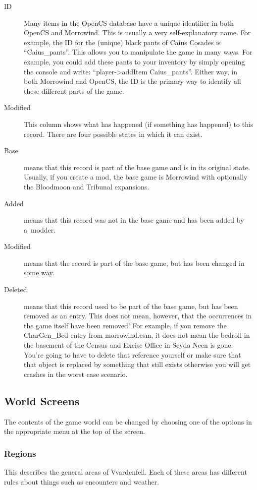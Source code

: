 \begin{description}
\item[ID] Many items in the OpenCS database have a unique identifier in both OpenCS and Morrowind. This is usually a very self-explanatory name. For example, the ID for the (unique) black pants of Caius Cosades is ``Caius\_pants''. This allows you to manipulate the game in many ways. For example, you could add these pants to your inventory by simply opening the console and write: ``player->addItem Caius\_pants''. Either way, in both Morrowind and OpenCS, the ID is the primary way to identify all these different parts of the game.
\item[Modified] This column shows what has happened (if something has happened) to this record. There are four possible states in which it can exist. 
\item[Base] means that this record is part of the base game and is in its original state. Usually, if you create a mod, the base game is Morrowind with
optionally the Bloodmoon and Tribunal expansions.
\item[Added] means that this record was not in the base game and has been added by a~modder.
\item[Modified] means that the record is part of the base game, but has been changed in some way.
\item[Deleted] means that this record used to be part of the base game, but has been removed as an entry. This does not mean, however, that the occurrences
in the game itself have been removed! For example, if you remove the CharGen\_Bed entry from morrowind.esm, it does not mean the bedroll in the basement
of the Census and Excise Office in Seyda Neen is gone. You're going to have to delete that reference yourself or make sure that that object is replaced
by something that still exists otherwise you will get crashes in the worst case scenario.
\end{description}

\subsection{World Screens}
The contents of the game world can be changed by choosing one of the options in the appropriate menu at the top of the screen.

\subsubsection{Regions}
This describes the general areas of Vvardenfell. Each of these areas has different rules about things such as encounters and weather.

